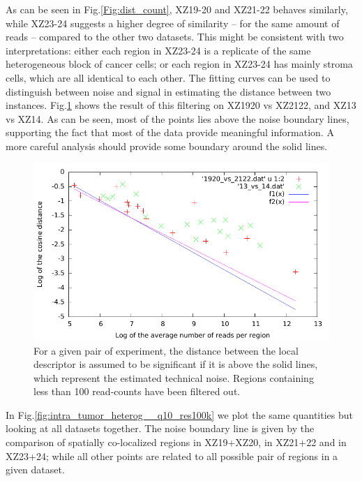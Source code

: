 \documentclass[11pt,a4paper]{article}
\begin{document}
As can be seen in Fig.\ref{Fig:dist_count}, XZ19-20 and XZ21-22 behaves similarly, while XZ23-24 suggests a higher degree of similarity -- for the same amount of reads -- compared to the other two datasets. This might be consistent with two interpretations: either each region in XZ23-24 is a replicate of the same heterogeneous block of cancer cells; or each region in XZ23-24 has mainly stroma cells, which are all identical to each other. The fitting curves can be used to distinguish between noise and signal in estimating the distance between two instances. Fig.\ref{Fig:filter_noise} shows the result of this filtering on XZ1920 vs XZ2122, and XZ13 vs XZ14. As can be seen, most of the points lies above the noise boundary lines, supporting the fact that most of the data provide meaningful information. A more careful analysis should provide some boundary around the solid lines.

\begin{figure}[hbtp]
\centering
\includegraphics[scale=1]{filter_noise.pdf}
\caption{For a given pair of experiment, the distance between the local descriptor is assumed to be significant if it is above the solid lines, which represent the estimated technical noise. Regions containing less than 100 read-counts have been filtered out.}
\label{Fig:filter_noise}
\end{figure}

In Fig.\ref{fig:intra_tumor_heterog__q10_res100k} we plot the same quantities but looking at all datasets together. The noise boundary line is given by the comparison of spatially co-localized regions in XZ19+XZ20, in XZ21+22 and in XZ23+24; while all other points are related to all possible pair of regions in a given dataset.
\end{document}
